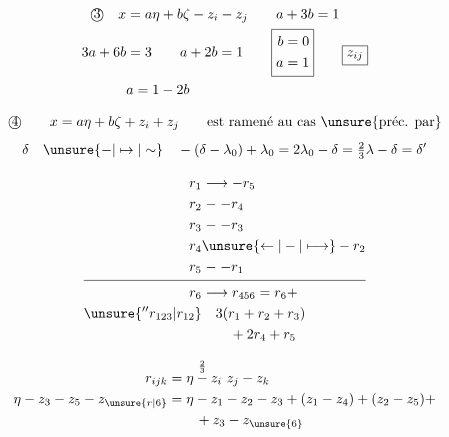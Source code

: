 {\[
\begin{aligned}
\text{\textcircled{3}}\quad x&=a\eta+b\zeta-z_i-z_j\qquad a+3b=1\\
3a+6b&=3\qquad a+2b=1\qquad
\boxed{\begin{aligned}b&=0\\a&=1\end{aligned}}\qquad\boxed{z_{ij}}\\
&a=1-2b
\end{aligned}
\]

\[
\text{\textcircled{4}}\qquad x=a\eta+b\zeta+z_i+z_j\qquad\text{est ramené au cas \unsure{préc. par}}
\]
\[
\delta\quad\unsure{-|\mapsto|\sim}\quad-(\delta-\lambda_0)+\lambda_0=2\lambda_0-\delta=\tfrac23\lambda-\delta=\delta'
\]

\[
\begin{aligned}
r_1&\longrightarrow-r_5\\r_2&\mathrel{-}-r_4\\r_3&\mathrel{-}-r_3\\
r_4&\unsure{\leftarrow|-|\longmapsto}-r_2\\r_5&\mathrel{-}-r_1\\ \noalign{\smallskip\hrule\smallskip}
r_6&\longrightarrow r_{456}=r_6+\\
\unsure{''r_{123}|r_{12}}&\quad 3(r_1+r_2+r_3)\\
&\qquad+2r_4+r_5
\end{aligned}
\]

\[
\begin{aligned}
r_{ijk}&=\eta\overset{\frac23}{-}z_i\ z_j-z_k\\
\eta-z_3-z_5-z_{\unsure{r|6}}&=\eta-z_1-z_2-z_3+
 (z_1-z_4)+(z_2-z_5)+\\
&\qquad +z_3-z_{\unsure{6}}
\end{aligned}
\]

}%
